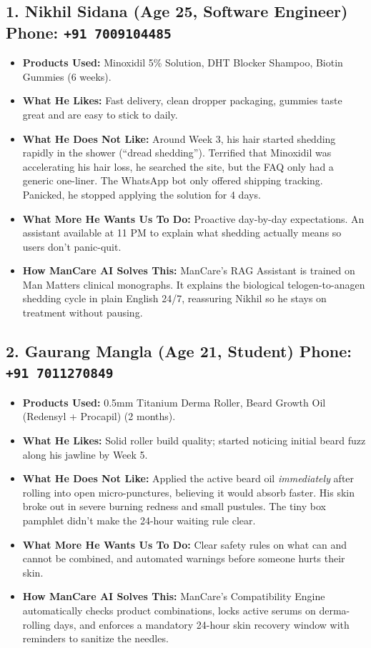 \documentclass[11pt,a4paper]{article}
\begin{document}
\subsection*{1. Nikhil Sidana (Age 25, Software Engineer) \hfill \normalfont\small Phone: \texttt{+91 7009104485}}
\begin{itemize}
    \item \textbf{Products Used:} Minoxidil 5\% Solution, DHT Blocker Shampoo, Biotin Gummies (6 weeks).
    \item \textbf{What He Likes:} Fast delivery, clean dropper packaging, gummies taste great and are easy to stick to daily.
    \item \textbf{What He Does Not Like:} Around Week 3, his hair started shedding rapidly in the shower (``dread shedding''). Terrified that Minoxidil was accelerating his hair loss, he searched the site, but the FAQ only had a generic one-liner. The WhatsApp bot only offered shipping tracking. Panicked, he stopped applying the solution for 4 days.
    \item \textbf{What More He Wants Us To Do:} Proactive day-by-day expectations. An assistant available at 11 PM to explain what shedding actually means so users don't panic-quit.
    \item \textbf{\color{brandteal}How ManCare AI Solves This:} ManCare's RAG Assistant is trained on Man Matters clinical monographs. It explains the biological telogen-to-anagen shedding cycle in plain English 24/7, reassuring Nikhil so he stays on treatment without pausing.
\end{itemize}

\subsection*{2. Gaurang Mangla (Age 21, Student) \hfill \normalfont\small Phone: \texttt{+91 7011270849}}
\begin{itemize}
    \item \textbf{Products Used:} 0.5mm Titanium Derma Roller, Beard Growth Oil (Redensyl + Procapil) (2 months).
    \item \textbf{What He Likes:} Solid roller build quality; started noticing initial beard fuzz along his jawline by Week 5.
    \item \textbf{What He Does Not Like:} Applied the active beard oil \textit{immediately} after rolling into open micro-punctures, believing it would absorb faster. His skin broke out in severe burning redness and small pustules. The tiny box pamphlet didn't make the 24-hour waiting rule clear.
    \item \textbf{What More He Wants Us To Do:} Clear safety rules on what can and cannot be combined, and automated warnings before someone hurts their skin.
    \item \textbf{\color{brandteal}How ManCare AI Solves This:} ManCare's Compatibility Engine automatically checks product combinations, locks active serums on derma-rolling days, and enforces a mandatory 24-hour skin recovery window with reminders to sanitize the needles.
\end{itemize}
\end{document}
